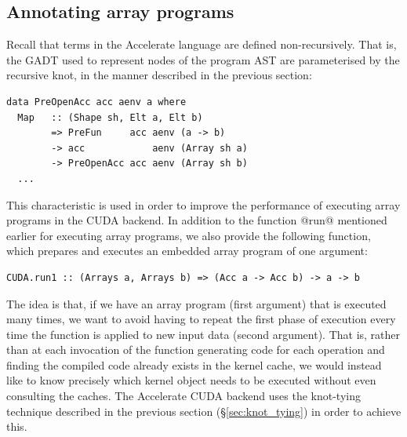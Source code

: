 \subsection{Annotating array programs}

Recall that terms in the Accelerate language are defined non-recursively. That
is, the GADT used to represent nodes of the program AST are parameterised by the
recursive knot, in the manner described in the previous section:
%
\begin{lstlisting}[style=haskell]
data PreOpenAcc acc aenv a where
  Map   :: (Shape sh, Elt a, Elt b)
        => PreFun     acc aenv (a -> b)
        -> acc            aenv (Array sh a)
        -> PreOpenAcc acc aenv (Array sh b)
  ...
\end{lstlisting}

This characteristic is used in order to improve the performance of executing
array programs in the CUDA backend. In addition to the function @run@
mentioned earlier for executing array programs, we also provide the following
function, which prepares and executes an embedded array program of one argument:
%
\begin{lstlisting}[style=haskell]
CUDA.run1 :: (Arrays a, Arrays b) => (Acc a -> Acc b) -> a -> b
\end{lstlisting}
%
The idea is that, if we have an array program (first argument) that is executed
many times, we want to avoid having to repeat the first phase of execution every
time the function is applied to new input data (second argument). That is,
rather than at each invocation of the function generating code for each
operation and finding the compiled code already exists in the kernel cache, we
would instead like to know precisely which kernel object needs to be executed
without even consulting the caches. The Accelerate CUDA backend uses the
knot-tying technique described in the previous section (\S\ref{sec:knot_tying})
in order to achieve this.

